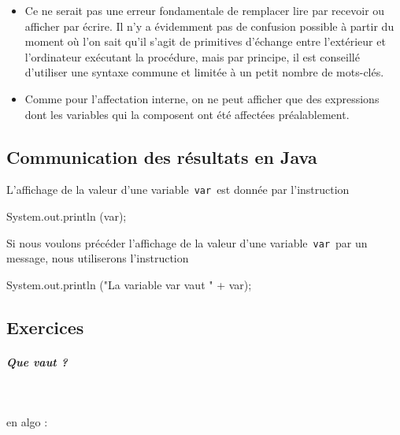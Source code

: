 \documentclass[11pt,a4paper]{article}
\begin{document}
					\begin{itemize}
				
			\item 
              Ce ne serait pas une erreur fondamentale de remplacer lire par recevoir ou afficher
              par \'ecrire. Il n'y a \'evidemment pas de confusion possible \`a partir du moment o\`u l'on
              sait qu'il s'agit de primitives d'\'echange entre l'ext\'erieur et l'ordinateur ex\'ecutant la
              proc\'edure, mais par principe, il est conseill\'e d'utiliser une syntaxe commune et limit\'ee
              \`a un petit nombre de mots-cl\'es.
            
			\item 
              Comme pour l'affectation interne, on ne peut afficher que des expressions dont les
              variables qui la composent ont \'et\'e affect\'ees pr\'ealablement.
            
					\end{itemize}
				
            \par
        \subsection{Communication des r\'esultats en Java}
          L'affichage de la valeur d'une variable \,\verb|var|\,  est donn\'ee par l'instruction
          
            \par
        \begin{Java}
 System.out.println (var);
				\end{Java}
          Si nous voulons pr\'ec\'eder l'affichage de la valeur d'une variable \,\verb|var|\,  par un message, 
          nous utiliserons l'instruction
        
            \par
        \begin{Java}
 System.out.println ("La variable var vaut " + var);
				\end{Java}\subsection{Exercices}
			
		\subparagraph{Que vaut ?} 
		
                \textcolor{white}{.} \par
            
							  en algo :
							
\end{document}
